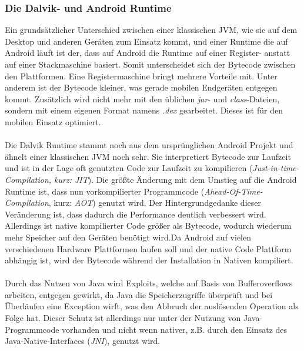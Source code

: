 \subsubsection{Die Dalvik- und Android Runtime}
	Ein grundsätzlicher Unterschied zwischen einer klassischen JVM, wie sie auf dem Desktop und anderen Geräten zum Einsatz kommt, und einer Runtime die auf Android läuft ist der, dass auf Android die Runtime auf einer Register- anstatt auf einer Stackmaschine basiert\cite{DalvikBytecode}. Somit unterscheidet sich der Bytecode zwischen den Plattformen. Eine Registermaschine bringt mehrere Vorteile mit. Unter anderem ist der Bytecode kleiner, was gerade mobilen Endgeräten entgegen kommt.
	Zusätzlich wird nicht mehr mit den üblichen \textit{jar}- und \textit{class}-Dateien, sondern mit einem eigenen Format namens \textit{.dex} gearbeitet\cite{DexFormat}. Dieses ist für den mobilen Einsatz optimiert.\\\\
	Die Dalvik Runtime stammt noch aus dem ursprünglichen Android Projekt und ähnelt einer klassischen JVM noch sehr. Sie interpretiert Bytecode zur Laufzeit und ist in der Lage oft genutzten Code zur Laufzeit zu kompilieren (\textit{Just-in-time-Compilation, kurz: JIT}).
	Die größte Änderung mit dem Umstieg auf die Android Runtime ist, dass nun vorkompilierter Programmcode (\textit{Ahead-Of-Time-Compilation}, kurz: \textit{AOT}) genutzt wird. Der Hintergrundgedanke dieser Veränderung ist, dass dadurch die Performance deutlich verbessert wird. Allerdings ist native kompilierter Code größer als Bytecode, wodurch wiederum mehr Speicher auf den Geräten benötigt wird.Da Android auf vielen verschiedenen Hardware Plattformen laufen soll und der native Code Plattform abhängig ist, wird der Bytecode während der Installation in Nativen kompiliert.\\\\
	Durch das Nutzen von Java wird Exploits, welche auf Basis von Bufferoverflows arbeiten, entgegen gewirkt, da Java die Speicherzugriffe überprüft und bei Überläufen eine Exception wirft, was den Abbruch der auslösenden Operation als Folge hat. Dieser Schutz ist allerdings nur unter der Nutzung von Java-Programmcode vorhanden und nicht wenn nativer, z.B. durch den Einsatz des Java-Native-Interfaces (\textit{JNI}), genutzt wird.